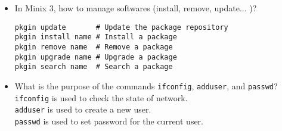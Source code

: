 \documentclass{article}
\begin{document}
\begin{itemize}
\item In Minix 3, how to manage softwares (install, remove, update... )?
\begin{verbatim}
pkgin update       # Update the package repository
pkgin install name # Install a package
pkgin remove name  # Remove a package
pkgin upgrade name # Upgrade a package
pkgin search name  # Search a package
\end{verbatim}

\item What is the purpose of the commands \texttt{ifconfig}, \texttt{adduser}, and \texttt{passwd}?\\[0.5em]
\texttt{ifconfig} is used to check the state of network. \\[0.5em]
\texttt{adduser} is used to create a new user. \\[0.5em]
\texttt{passwd} is used to set password for the current user. 
\end{itemize}
\end{document}
